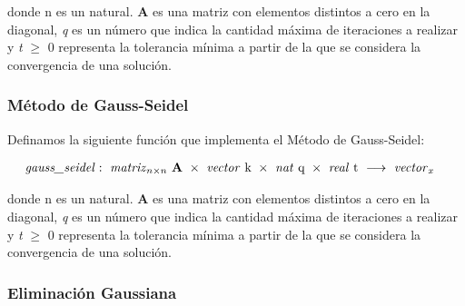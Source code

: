 donde n es un natural. \textbf{A} es una matriz con elementos distintos a cero en la diagonal, \textit{q} es un número que indica la cantidad máxima de iteraciones a realizar y \textit{t} $\geq$ 0 representa la tolerancia mínima a partir de la que se considera la convergencia de una solución.



\vspace{2em}
\subsubsection{Método de Gauss-Seidel}
Definamos la siguiente función que implementa el Método de Gauss-Seidel:

\begin{align*}
    \text{\textit{gauss\_seidel}}&:\ \text{\textit{matriz}}_{n \times n}\ \mathbf{A}\ \times\ \text{\textit{vector} k}\ \times\ \text{\textit{nat} q}\ \times\ \text{\textit{real} t}\
    \longrightarrow\ \text{\textit{vector}}_x
\end{align*}

donde n es un natural. \textbf{A} es una matriz con elementos distintos a cero en la diagonal, \textit{q} es un número que indica la cantidad máxima de iteraciones a realizar y \textit{t} $\geq$ 0 representa la tolerancia mínima a partir de la que se considera la convergencia de una solución.




\vspace{2em}
\subsubsection{Eliminación Gaussiana}